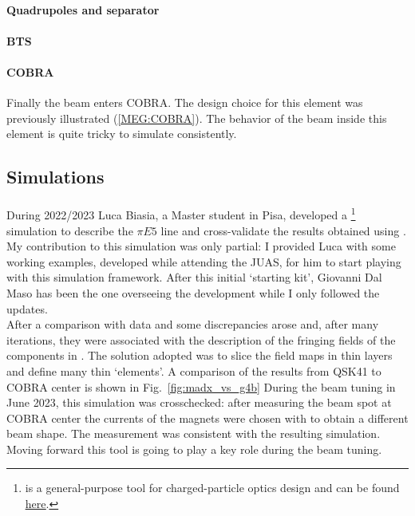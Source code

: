 \begin{refsection}
        \paragraph{Quadrupoles and separator}
        \paragraph{BTS}
        \paragraph{COBRA} Finally the beam enters COBRA. 
        The design choice for this element was previously illustrated (\ref{MEG:COBRA}). 
        The behavior of the beam inside this element is quite tricky to simulate consistently.
        
    \subsection{Simulations}
        \paragraph{\gfb}
        \paragraph{\madx} During 2022/2023 Luca Biasia, a Master student in Pisa, developed a \madx\footnote{\madx is a general-purpose tool for charged-particle optics design and can be found \href{http://madx.web.cern.ch/madx/}{\underline{here}}.} simulation to describe the $\pi E5$ line and cross-validate the results obtained using \gfb. 
        My contribution to this simulation was only partial: I provided Luca with some working \madx examples, developed while attending the JUAS, for him to start playing with this simulation framework. 
        After this initial `starting kit', Giovanni Dal Maso has been the one overseeing the development while I only followed the updates. \\
        After a comparison with data and \gfb some discrepancies arose and, after many iterations, they were associated with the description of the fringing fields of the components in \madx. 
        The solution adopted was to slice the field maps in thin layers and define many thin `\madx elements'. 
        A comparison of the results from QSK41 to COBRA center is shown in Fig.~\ref{fig:madx_vs_g4b}
        During the beam tuning in June 2023, this simulation was crosschecked: after measuring the beam spot at COBRA center the currents of the magnets were chosen with \madx to obtain a different beam shape. 
        The measurement was consistent with the resulting simulation.
        Moving forward this tool is going to play a key role during the beam tuning.


\end{refsection}
